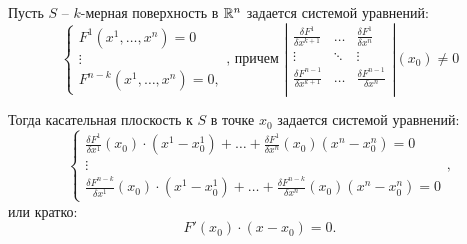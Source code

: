 \newpage

\begin{statement}
    Пусть $S$ -- $k$-мерная поверхность в $\mathbb{R}^n$ задается системой уравнений:
    \begin{equation}\label{eq:9}
        \left\{\begin{array}{l}
            F^1(x^1,\ldots,x^n) = 0 \\
            \vdots                  \\
            F^{n-k}(x^1,\ldots,x^n) = 0,
        \end{array}\right.\text{, причем }\left|\begin{array}{ccc}
            \frac{\delta F^1}{\delta x^{k+1}}     & \ldots & \frac{\delta F^1}{\delta x^n}     \\
            \vdots                                & \ddots & \vdots                            \\
            \frac{\delta F^{n-1}}{\delta x^{k+1}} & \ldots & \frac{\delta F^{n-1}}{\delta x^n} \\
        \end{array}\right|(x_0) \ne 0
    \end{equation}

    Тогда касательная плоскость к $S$ в точке $x_0$ задается системой уравнений:
    \[
        \left\{\begin{array}{l}
            \frac{\delta F^1}{\delta x^1}(x_0)\cdot (x^1-x^1_0) + \ldots + \frac{\delta F^1}{\delta x^n}(x_0)(x^n - x_0^n) = 0 \\
            \vdots                                                                                                             \\
            \frac{\delta F^{n-k}}{\delta x^1}(x_0)\cdot (x^1-x^1_0) + \ldots + \frac{\delta F^{n-k}}{\delta x^n}(x_0)(x^n - x_0^n) = 0
        \end{array}\right.,
    \]
    или кратко:
    \[
        F'(x_0)\cdot(x-x_0) = 0.
    \]
\end{statement}

